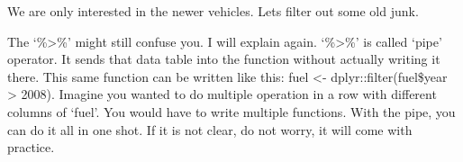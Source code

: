 \documentclass[]{book}
\newenvironment{Shaded}{\begin{snugshade}}{\end{snugshade}}
\newcommand{\CommentTok}[1]{\textcolor[rgb]{0.56,0.35,0.01}{\textit{#1}}}
\newcommand{\DecValTok}[1]{\textcolor[rgb]{0.00,0.00,0.81}{#1}}
\newcommand{\KeywordTok}[1]{\textcolor[rgb]{0.13,0.29,0.53}{\textbf{#1}}}
\newcommand{\NormalTok}[1]{#1}
\newcommand{\OperatorTok}[1]{\textcolor[rgb]{0.81,0.36,0.00}{\textbf{#1}}}
\newcommand{\StringTok}[1]{\textcolor[rgb]{0.31,0.60,0.02}{#1}}
\begin{document}
\begin{Shaded}
\end{Shaded}

We are only interested in the newer vehicles. Lets filter out some old junk.

\begin{Shaded}
\end{Shaded}

The `\%\textgreater{}\%' might still confuse you. I will explain again. `\%\textgreater{}\%' is called `pipe' operator. It sends that data table into the function without actually writing it there. This same function can be written like this: fuel \textless{}- dplyr::filter(fuel\$year \textgreater{} 2008). Imagine you wanted to do multiple operation in a row with different columns of `fuel'. You would have to write multiple functions. With the pipe, you can do it all in one shot. If it is not clear, do not worry, it will come with practice.
\end{document}
